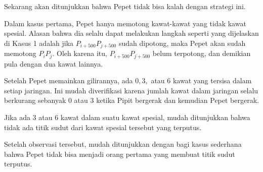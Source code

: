 \documentclass[12pt]{scrartcl}
\begin{document}
\begin{soaljawab}
\begin{solusi}
Sekarang akan ditunjukkan bahwa Pepet tidak bisa kalah dengan strategi ini.

Dalam kasus pertama, Pepet hanya memotong kawat-kawat yang tidak kawat spesial. Alasan bahwa dia selalu dapat melakukan langkah seperti yang dijelaskan di Kasus 1 adalah jika $P_{i+500}P_{j+500}$ sudah dipotong, maka Pepet akan sudah memotong $P_iP_j$. Oleh karena itu, $P_{i+500}P_{j+500}$ belum terpotong, dan demikian pula dengan dua kawat lainnya.

Setelah Pepet memainkan gilirannya, ada $0, 3,$ atau $6$ kawat yang tersisa dalam setiap jaringan. Ini mudah diverifikasi karena jumlah kawat dalam jaringan selalu berkurang sebanyak $0$ atau $3$ ketika Pipit bergerak dan kemudian Pepet bergerak.

Jika ada $3$ atau $6$ kawat dalam suatu kawat spesial, mudah ditunjukkan bahwa tidak ada titik sudut dari kawat spesial tersebut yang terputus. 

Setelah observasi tersebut, mudah ditunjukkan dengan bagi kasus sederhana bahwa Pepet tidak bisa menjadi orang pertama yang membuat titik sudut terputus.
    \end{solusi}
\end{soaljawab}
\end{document}
